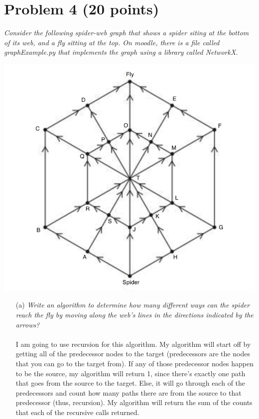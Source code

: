 \documentclass[12pt]{article}
\begin{document}
{\section*{{\selectfont Problem 4 (20 points)}}\vspace{-10mm}
\textsl{Consider the following spider-web graph that shows a spider siting at the bottom of its web, and a fly sitting at the top. On moodle, there is a file called graphExample.py that implements the graph using a library called NetworkX.}
\begin{center}
  \includegraphics[scale=0.4]{Web.png}
\end{center}
\begin{enumerate}
\item[(a)]\textsl{Write an algorithm to determine how many different ways can the spider reach the fly by moving along the web’s lines in the directions indicated by the arrows?}\\ \\
I am going to use recursion for this algorithm. My algorithm will start off by getting all of the predecessor nodes to the target (predecessors are the nodes that you can go to the target from). If any of those predecessor nodes happen to be the source, my algorithm will return 1, since there's exactly one path that goes from the source to the target. Else, it will go through each of the predecessors and count how many paths there are from the source to that predecessor (thus, recursion). My algorithm will return the sum of the counts that each of the recursive calls returned.

\end{enumerate}}
\end{document}
